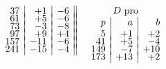\documentclass[twoside,12pt]{memoir}
\begin{document}
\[\begin{array}{cccc}
\begin{array}[t]{r|r|r||}
37&+1&-6\\[-4pt]
61&+5&-6\\[-4pt]
73&-3&-8\\[-4pt]
97&+9&+4\\[-4pt]
157&-11&-6\\[-4pt] 
241&-15&-4 
\end{array}
&
 \begin{array}[t]{r|r|r} 
 \multicolumn{3}{c}{ D \text{ pro} }\\
 p & a & b \\
5&+1&+2\\[-4pt]
41&+5&-4\\[-4pt]
149&-7&+10\\[-4pt]
173&+13&+2
\end{array}
\end{array}\]\pagebreak%
\end{document}
